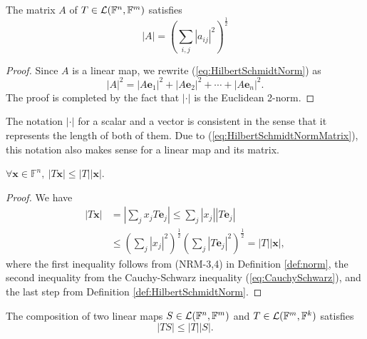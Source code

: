 \begin{coro}
  \label{coro:HilbertSchmidtNormMatrix}
  The matrix $A$ %
  of \mbox{$T\in {\cal L}(\mathbb{F}^n,\mathbb{F}^m)$}
  satisfies
  \begin{equation}
    \label{eq:HilbertSchmidtNormMatrix}
    |A| = \left(
      \sum_{i,j} |a_{ij}|^2
    \right)^{\frac{1}{2}}
  \end{equation}
\end{coro}
\begin{proof}
  Since $A$ is a linear map, we rewrite (\ref{eq:HilbertSchmidtNorm}) as
  \begin{displaymath}
    |A|^2 =  |A \mathbf{e}_1|^2 + |A \mathbf{e}_2|^2 + \cdots
    + |A \mathbf{e}_n|^2.
  \end{displaymath}
  The proof is completed by the fact that
  $|\cdot|$ is the Euclidean 2-norm.
\end{proof}

\begin{rem}
  The notation $|\cdot|$ for a scalar and a vector
  is consistent in the sense that
  it represents the length of both of them.
  Due to (\ref{eq:HilbertSchmidtNormMatrix}),
  this notation also makes sense for a linear map
  and its matrix.
\end{rem}

\begin{coro}
  \label{coro:HSnormIneq}
  $\forall \mathbf{x}\in \mathbb{F}^n,\
  |T\mathbf{x}| \le |T||\mathbf{x}|$.
\end{coro}
\begin{proof}
  We have
  \begin{displaymath}
    \begin{array}{rl}
    |T \mathbf{x}| 
    &= \left|\sum_j x_j T\mathbf{e}_j\right|
    \le \sum_j |x_j| \left|T\mathbf{e}_j\right|
    \\
    &\le \left(\sum_j |x_j|^2\right)^{\frac{1}{2}}
    \left(\sum_j \left|T\mathbf{e}_j\right|^2
      \right)^{\frac{1}{2}}
      = |T||\mathbf{x}|,
    \end{array}
  \end{displaymath}
  where the first inequality follows from
  (NRM-3,4) in Definition \ref{def:norm}, 
  the second inequality from
  the Cauchy-Schwarz inequality (\ref{eq:CauchySchwarz}), 
  and the last step from Definition \ref{def:HilbertSchmidtNorm}.
\end{proof}

\begin{coro}
  \label{coro:compositionTriangleIneqHS}
  The composition of two linear maps
  \mbox{$S\in {\cal L}(\mathbb{F}^n,\mathbb{F}^m)$}
   and \mbox{$T\in {\cal L}(\mathbb{F}^m,\mathbb{F}^k)$}
  satisfies
  \begin{equation}
    \label{eq:compositionTriangleIneqHS}
    |TS| \le |T| |S|.
  \end{equation}
\end{coro}

